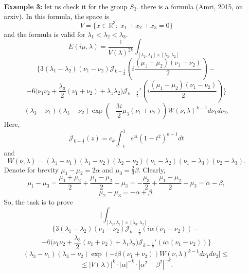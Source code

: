 \documentclass{amsart}
\begin{document}
{\bf Example 3:} let us check it for the group $S_3.$ there is a formula (Amri, 2015, on arxiv). In this formula, the space is
$$V=\{x\in\mathbb{R}^3:\ x_1+x_2+x_3=0\}$$
and the formula is valid for $\lambda_1<\lambda_2<\lambda_3.$
$$E(i\mu,\lambda)=\frac1{V(\lambda)^{2k}}\int_{[\lambda_2,\lambda_1]\times[\lambda_3,\lambda_2]}$$
$$\Big\{3(\lambda_1-\lambda_2)(\nu_1-\nu_2)\mathcal{J}_{k-\frac12}(i\frac{(\mu_1-\mu_2)(\nu_1-\nu_2)}{2})-$$
$$-6\big(\nu_1\nu_2+\frac{\lambda_3}{2}(\nu_1+\nu_2)+\lambda_1\lambda_2\big)\mathcal{J}_{k-\frac12}'(i\frac{(\mu_1-\mu_2)(\nu_1-\nu_2)}{2})\Big\}$$
$$(\lambda_3-\nu_1)(\lambda_3-\nu_2)\exp(-\frac{3i}{2}\mu_3(\nu_1+\nu_2))W(\nu,\lambda)^{k-1}d\nu_1d\nu_2.$$
Here,
$$\mathcal{J}_{k-\frac12}(z)=c_k\int_{-1}^1e^{zt}(1-t^2)^{k-1}dt$$
and 
$$W(\nu,\lambda)=(\lambda_1-\nu_1)(\lambda_1-\nu_2)(\lambda_2-\nu_2)(\nu_1-\lambda_2)(\nu_1-\lambda_3)(\nu_2-\lambda_3).$$
Denote for brevity $\mu_1-\mu_2=2\alpha$ and $\mu_3=\frac{2}{3}\beta.$ Clearly,
$$\mu_1-\mu_3=\frac{\mu_1+\mu_2}{2}+\frac{\mu_1-\mu_2}{2}-\mu_3=-\frac{\mu_3}{2}+\frac{\mu_1-\mu_2}{2}-\mu_3=\alpha-\beta,$$
$$\mu_2-\mu_3=-\alpha+\beta.$$
So, the task is to prove
$$\Big|\int_{[\lambda_2,\lambda_1]\times[\lambda_3,\lambda_2]}$$
$$\Big\{3(\lambda_1-\lambda_2)(\nu_1-\nu_2)\mathcal{J}_{k-\frac12}(i\alpha(\nu_1-\nu_2))-$$
$$-6\big(\nu_1\nu_2+\frac{\lambda_3}{2}(\nu_1+\nu_2)+\lambda_1\lambda_2\big)\mathcal{J}_{k-\frac12}'(i\alpha(\nu_1-\nu_2))\Big\}$$
$$(\lambda_3-\nu_1)(\lambda_3-\nu_2)\exp(-i\beta(\nu_1+\nu_2))W(\nu,\lambda)^{k-1}d\nu_1d\nu_2\Big|\leq$$
$$\leq |V(\lambda)|^k\cdot |\alpha|^{-k}\cdot |\alpha^2-\beta^2|^{-k}.$$
\end{document}
